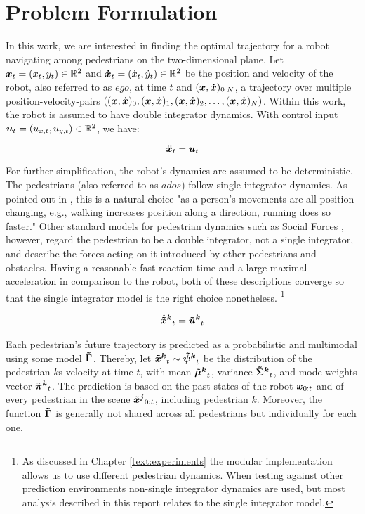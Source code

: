 
\section{Problem Formulation}
\label{text:approach/formulation}
In this work, we are interested in finding the optimal trajectory for a robot navigating among pedestrians on the two-dimensional plane. Let $\boldsymbol{x}_t = (x_t, y_t) \in \mathbb{R}^2$ and $\boldsymbol{\dot{x}}_t = (\dot{x}_t, \dot{y}_t) \in \mathbb{R}^2 $ be the position and velocity of the robot, also referred to as $ego$, at time $t$ and $(\boldsymbol{x}, \boldsymbol{\dot{x}})_{0:N}$, a trajectory over multiple position-velocity-pairs $((\boldsymbol{x}, \boldsymbol{\dot{x}})_0, (\boldsymbol{x}, \boldsymbol{\dot{x}})_1, (\boldsymbol{x}, \boldsymbol{\dot{x}})_2, \hdots, (\boldsymbol{x}, \boldsymbol{\dot{x}})_N)$. Within this work, the robot is assumed to have double integrator dynamics. With control input $\boldsymbol{u}_t = (u_{x, t}, u_{y, t}) \in \mathbb{R}^2$, we have: 

\begin{equation}
\boldsymbol{\ddot{x}}_t = \boldsymbol{u}_t
\label{eq:robot_dynamics}
\end{equation}

For further simplification, the robot's dynamics are assumed to be deterministic. 
The pedestrians (also referred to as $ados$) follow single integrator dynamics. As pointed out in \cite{Ivanovic2018}, this is a natural choice "as a person's movements are all position-changing, e.g., walking increases position along a direction, running does so faster." Other standard models for pedestrian dynamics such as Social Forces \cite{Helbing1995}, however, regard the pedestrian to be a double integrator, not a single integrator, and describe the forces acting on it introduced by other pedestrians and obstacles. Having a reasonable fast reaction time and a large maximal acceleration in comparison to the robot, both of these descriptions converge so that the single integrator model is the right choice nonetheless. \footnote{As discussed in Chapter \ref{text:experiments} the modular implementation allows us to use different pedestrian dynamics. When testing against other prediction environments non-single integrator dynamics are used, but most analysis described in this report relates to the single integrator model.}

\begin{align}
\dxped[k]_t = \uped[k]_t
\label{eq:pedestrian_dynamics}
\end{align}

Each pedestrian's future trajectory is predicted as a probabilistic and multimodal using some model $\distmodel[]$. Thereby, let $\xped[k]_t \sim \dist[k]_t$ be the distribution of the pedestrian $k$s velocity at time $t$, with mean $\muped[k]_t$, variance $\sigmaped[k]_t$, and mode-weights vector $\piped[k]_t$. The prediction is based on the past states of the robot $\boldsymbol{x}_{0:t}$ and of every pedestrian in the scene $\xped[j]_{0:t}$, including pedestrian $k$. Moreover, the function $\distmodel[]$ is generally not shared across all pedestrians but individually for each one.

